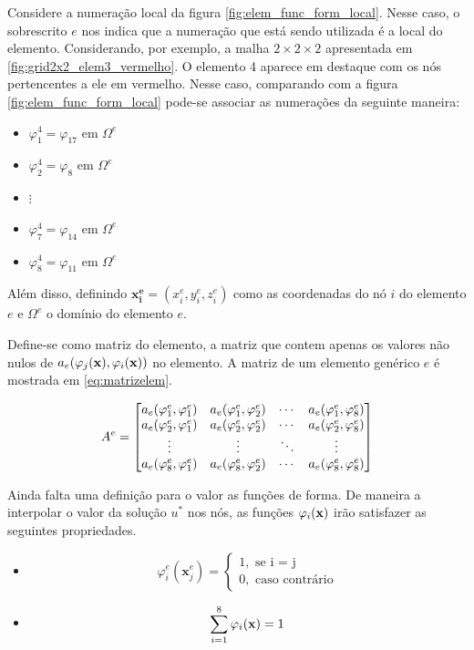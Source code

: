 Considere a numeração local da figura \ref{fig:elem_func_form_local}. Nesse caso, o sobrescrito $e$ nos indica que a numeração que está sendo utilizada é a local do elemento. Considerando, por exemplo, a malha $2\times2\times2$ apresentada em \ref{fig:grid2x2_elem3_vermelho}. O elemento 4 aparece em destaque com os nós pertencentes a ele em vermelho. Nesse caso, comparando com a figura \ref{fig:elem_func_form_local} pode-se associar as numerações da seguinte maneira:

\begin{itemize}
   \item $\varphi^4_1=\varphi_{17}$ em $\Omega^e$
   \item $\varphi^4_2=\varphi_{8}$ em $\Omega^e$
   \item $\vdots$
   \item $\varphi^4_7=\varphi_{14}$ em $\Omega^e$
   \item $\varphi^4_8=\varphi_{11}$ em $\Omega^e$
\end{itemize}




Além disso, definindo $\mathbf{x^e_i} = (x^e_i, y^e_i, z^e_i)$ como as coordenadas do nó $i$ do elemento $e$ e $\Omega^e$ o domínio do elemento $e$.



Define-se como matriz do elemento, a matriz que contem apenas os valores não nulos de $a_e(\varphi_j(\mathbf{x}),\varphi_i(\mathbf{x}))$ no elemento. A matriz de um elemento genérico $e$ é mostrada em \ref{eq:matrizelem}.

\begin{equation}
\label{eq:matrizelem}
A^e = \begin{bmatrix} a_e(\varphi^e_{1}, \varphi^e_{1}) & a_e(\varphi^e_{1}, \varphi^e_{2}) & \cdots & a_e(\varphi^e_{1}, \varphi^e_{8}) \\ a_e(\varphi^e_{2}, \varphi^e_{1}) & a_e(\varphi^e_{2}, \varphi^e_{2}) & \cdots & a_e(\varphi^e_{2}, \varphi^e_{8}) \\ \vdots & \vdots & \ddots & \vdots \\ a_e(\varphi^e_{8}, \varphi^e_{1}) & a_e(\varphi^e_{8}, \varphi^e_{2}) & \cdots & a_e(\varphi^e_{8}, \varphi^e_{8}) \\ \end{bmatrix}
\end{equation}


Ainda falta uma definição para o valor as funções de forma. De maneira a interpolar o valor da solução $u^*$ nos nós, as funções $\varphi_i(\mathbf{x})$ irão satisfazer as seguintes propriedades.

\begin{itemize}
\item \begin{equation}\label{eq:func_cond1}
\varphi^e_i(\mathbf{x}^e_j) = \left\{\begin{matrix} 1, \text{ se i = j} \\  0, \text{ caso contrário} \end{matrix}\right.
\end{equation}
\item \begin{equation}\label{eq:func_cond2}
    \sum_{i=1}^8 \varphi_i(\mathbf{x}) = 1
\end{equation}
\end{itemize}


